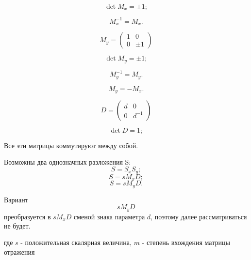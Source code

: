 $$\det M_x = \pm 1;$$

$$M_x^{-1} = M_x.$$

$$M_y = \begin{pmatrix}
	1 & 0 \\
	0 & \pm 1
\end{pmatrix}$$

$$\det M_y = \pm 1;$$

$$M_y^{-1} = M_y.$$

$$M_y = -M_x.$$


$$D = \begin{pmatrix}
	d & 0 \\
	0 & d^{-1}
\end{pmatrix}$$

$$\det D = 1;$$

Все эти матрицы коммутируют между собой.

Возможны два однозначных разложения S:
$$S = S_x S_y;$$
$$S = s M_x D;$$
$$S = s M_y D.$$

Вариант $$s M_y D$$ преобразуется в $s M_x D$ сменой знака параметра $d$, поэтому далее рассматриваться не будет.

где $s$ - положительная скалярная величина, $m$ - степень вхождения матрицы отражения
